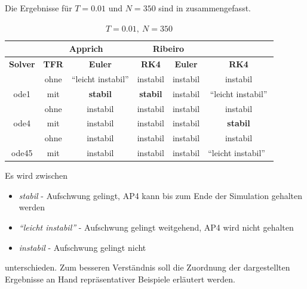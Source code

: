 Die Ergebnisse für $T=0.01$ und $N=350$ sind in  zusammengefasst.
\begin{table}[h]
	\centering
	\caption{$T=0.01, \ N=350$}
		\begin{tabular}{c|c|c|c|c|c}
			\rowcolor[gray]{0.9}
			\multicolumn{2}{c|}{\textbf{Simulation}} & \multicolumn{2}{c|}{\textbf{Apprich}} & \multicolumn{2}{c}{\textbf{Ribeiro}} \\
			\midrule
			\rowcolor[gray]{0.9}
			\textbf{Solver} & \textbf{TFR} & \textbf{Euler} & \textbf{RK4} & \textbf{Euler} & \textbf{RK4} \\
			\midrule
			\cellcolor[gray]{0.9}  											& \cellcolor[gray]{.9}ohne & "`leicht instabil"' & instabil       & instabil & instabil\\
			\multirow{-2}{*}{\cellcolor[gray]{.9}ode1}	& \cellcolor[gray]{.9}mit  & \textbf{stabil} & \textbf{stabil} & instabil & "`leicht instabil"'\\
			\midrule
			\cellcolor[gray]{0.9}  											& \cellcolor[gray]{.9}ohne    & instabil	&  instabil & instabil & instabil\\
			\multirow{-2}{*}{\cellcolor[gray]{.9}ode4}	& \cellcolor[gray]{.9}mit     & instabil  & instabil  & instabil & \textbf{stabil}\\
			\midrule	
			\cellcolor[gray]{0.9}  											& \cellcolor[gray]{.9}ohne    & instabil &  instabil    & instabil 	& instabil\\
			\multirow{-2}{*}{\cellcolor[gray]{.9}ode45}	& \cellcolor[gray]{.9}mit     & instabil &  instabil    & instabil 	& "`leicht instabil"'\																							
		\end{tabular}
	\label{tab:T001N350Fmax400}
\end{table}

Es wird zwischen 

\begin{itemize}
	\item \textit{stabil} - Aufschwung gelingt, AP4 kann bis zum Ende der Simulation gehalten werden
	\item \textit{"`leicht instabil"'} - Aufschwung gelingt weitgehend, AP4 wird nicht gehalten
	\item \textit{instabil} - Aufschwung gelingt nicht
\end{itemize}
unterschieden. Zum besseren Verständnis soll die Zuordnung der dargestellten Ergebnisse an Hand repräsentativer Beispiele erläutert werden.


